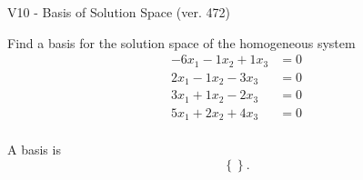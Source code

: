 \begin{exercise}
  \begin{exerciseTitle}V10 - Basis of Solution Space (ver. 472)\end{exerciseTitle}
  \begin{exerciseStatement}
    Find a basis for the solution space of the homogeneous system 
\begin{align*}
 -6 x_ 1 -1 x_ 2 + 1 x_ 3 &= 0  \\ 
  2 x_ 1 -1 x_ 2 -3 x_ 3 &= 0  \\ 
  3 x_ 1 + 1 x_ 2 -2 x_ 3 &= 0  \\ 
  5 x_ 1 + 2 x_ 2 + 4 x_ 3 &= 0  \\ 
 \end{align*}


 
  \end{exerciseStatement}

  \begin{exerciseAnswer}
   A basis is   
\[\left\{\right\}.\]

  


  \end{exerciseAnswer}
\end{exercise}